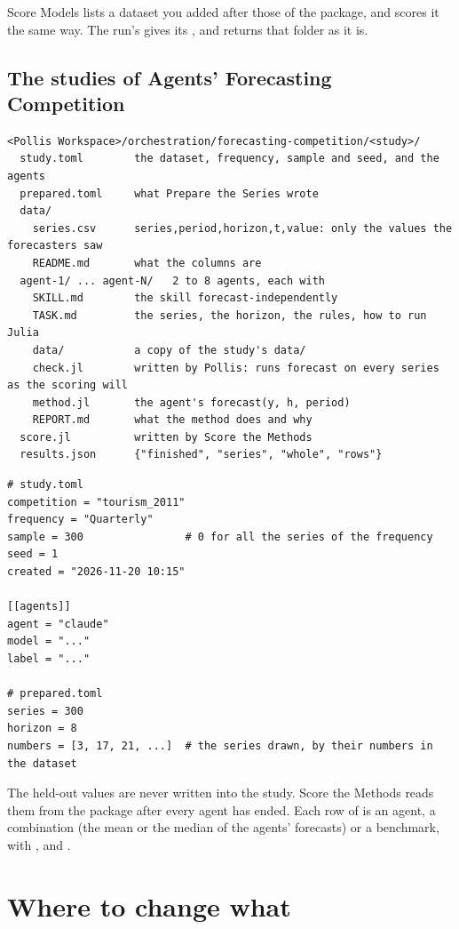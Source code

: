 Score Models lists a dataset you added after those of the package, and scores it the same way. The run's
 gives its , and  returns that folder as it is.

\subsection{The studies of Agents' Forecasting Competition}

\begin{lstlisting}
<Pollis Workspace>/orchestration/forecasting-competition/<study>/
  study.toml        the dataset, frequency, sample and seed, and the agents
  prepared.toml     what Prepare the Series wrote
  data/
    series.csv      series,period,horizon,t,value: only the values the forecasters saw
    README.md       what the columns are
  agent-1/ ... agent-N/   2 to 8 agents, each with
    SKILL.md        the skill forecast-independently
    TASK.md         the series, the horizon, the rules, how to run Julia
    data/           a copy of the study's data/
    check.jl        written by Pollis: runs forecast on every series as the scoring will
    method.jl       the agent's forecast(y, h, period)
    REPORT.md       what the method does and why
  score.jl          written by Score the Methods
  results.json      {"finished", "series", "whole", "rows"}
\end{lstlisting}

\begin{lstlisting}
# study.toml
competition = "tourism_2011"
frequency = "Quarterly"
sample = 300                # 0 for all the series of the frequency
seed = 1
created = "2026-11-20 10:15"

[[agents]]
agent = "claude"
model = "..."
label = "..."

# prepared.toml
series = 300
horizon = 8
numbers = [3, 17, 21, ...]  # the series drawn, by their numbers in the dataset
\end{lstlisting}

The held-out values are never written into the study. Score the Methods reads them from the package after every agent
has ended. Each row of  is an agent, a combination (the mean or the median of the agents'
forecasts) or a benchmark, with ,  and .

\section{Where to change what}

